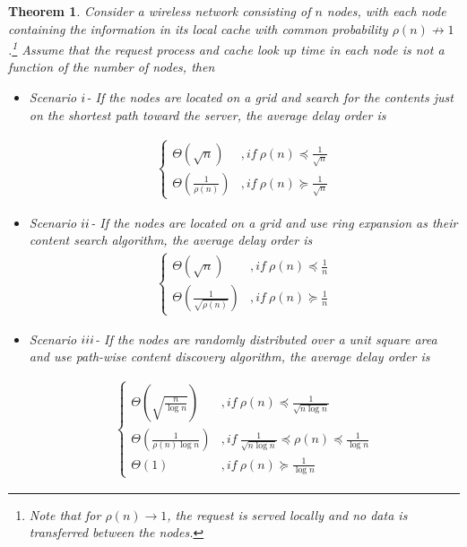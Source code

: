 \documentclass[journal]{IEEEtran}
\theoremstyle{plain}
\newtheorem{theorem}{Theorem}
\theoremstyle{remark}
\begin{document}
\begin{theorem} \label{thm:02}
	Consider a wireless network consisting of $n$ nodes, with each node containing the information in its local cache with common probability $\rho(n)\nrightarrow 1$.\footnote{Note that for $\rho (n) \rightarrow 1$, the request is served locally and no data is transferred between the nodes.} Assume that the request process and cache look up time in each node is not a function of the number of nodes, then
	
	\begin{itemize}
		\item Scenario $\romannumeral 1$- If the nodes are located on a grid and search for the contents just on the shortest path toward the server, the average delay order is
		
		\begin{eqnarray}
			\left\{\begin{array}{ll}
					\Theta(\sqrt{n})& ,if\ \rho(n)\preceq \frac{1}{\sqrt{n}} \\
					\Theta(\frac{1}{\rho(n)})& ,if\ \rho(n)\succeq \frac{1}{\sqrt{n}} \nonumber
		\end{array}\right .
		\end{eqnarray}
		
		\item Scenario $\romannumeral 2$- If the nodes are located on a grid and use ring expansion as their content search algorithm, the average delay order is
		\begin{eqnarray}
			\left\{\begin{array}{ll}
					\Theta(\sqrt{n})& ,if\ \rho(n)\preceq \frac{1}{n} \\
					\Theta(\frac{1}{\sqrt{\rho(n)}})& ,if\ \rho(n)\succeq \frac{1}{n} \nonumber
		\end{array}\right .
		\end{eqnarray}		
		
		\item Scenario $\romannumeral 3$- If the nodes are randomly distributed over a unit square area and use path-wise content discovery algorithm, the average delay order is 	
		
		\begin{eqnarray}
			\left\{\begin{array}{ll}
					\Theta(\sqrt{\frac{n}{\log n}})& ,if\ \rho(n)\preceq \frac{1}{\sqrt{n\log n}}  \\
					\Theta(\frac{1}{\rho(n)\log n})& ,if\ \frac{1}{\sqrt{n\log n}} \preceq \rho(n) \preceq \frac{1}{\log n} \\
					\Theta(1)& ,if\  \rho(n)\succeq \frac{1}{\log n}\nonumber
		\end{array}\right .
		\end{eqnarray}
		\end{itemize}
\end{theorem}
\end{document}

